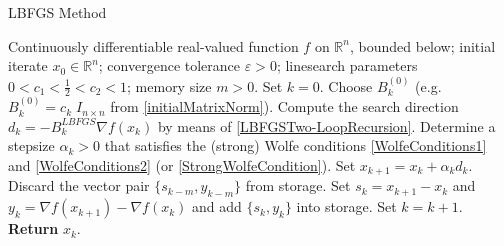 \begin{algorithm}[H]
	\caption{LBFGS Method} \label{LBFGSMethod}
    \begin{algorithmic}[1]
        \State Continuously differentiable real-valued function $f$ on $\mathbb{R}^n$, bounded below; initial iterate $x_0 \in \mathbb{R}^n$; convergence tolerance $\varepsilon > 0$; linesearch parameters $0 < c_1 < \frac{1}{2} < c_2 < 1$; memory size $m > 0$. Set $k = 0$.
            \State Choose $B^{(0)}_k$ (e.g. $B^{(0)}_k = c_k \; I_{n \times n}$ from \cref{initialMatrixNorm}).
            \State Compute the search direction $d_k = - B^{LBFGS}_k \nabla f(x_k)$ by means of \cref{LBFGSTwo-LoopRecursion}.
            \State Determine a stepsize $\alpha_k > 0$ that satisfies the (strong) Wolfe conditions \cref{WolfeConditions1} and \cref{WolfeConditions2} 
            \StatexIndent[2] (or \cref{StrongWolfeCondition}). 
            \State Set $x_{k+1} = x_k + \alpha_k d_k$.
                \State Discard the vector pair $\{ s_{k−m},y_{k−m}\}$ from storage. 
            \EndIf
            \State Set $s_k = x_{k+1} - x_k$ and $y_k = \nabla f(x_{k+1}) - \nabla f(x_k)$ and add $\{s_k, y_k \}$ into storage.
            \State Set $k = k+1$.
        \EndWhile
        \State \textbf{Return} $x_k$.
    \end{algorithmic}
\end{algorithm}

